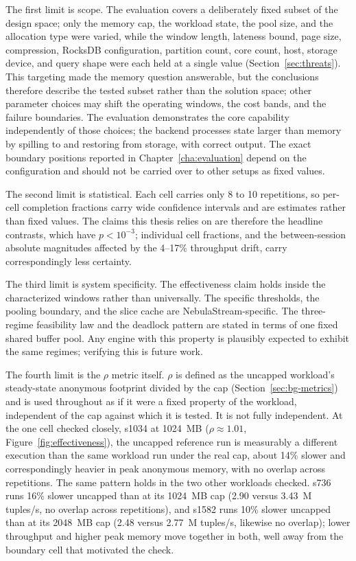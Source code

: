 The first limit is scope.
The evaluation covers a deliberately fixed subset of the design space; only the memory cap, the workload state, the pool size, and the allocation type were varied, while the window length, lateness bound, page size, compression, RocksDB configuration, partition count, core count, host, storage device, and query shape were each held at a single value (Section~\ref{sec:threats}).
This targeting made the memory question answerable, but the conclusions therefore describe the tested subset rather than the solution space; other parameter choices may shift the operating windows, the cost bands, and the failure boundaries.
The evaluation demonstrates the core capability independently of those choices; the backend processes state larger than memory by spilling to and restoring from storage, with correct output.
The exact boundary positions reported in Chapter~\ref{cha:evaluation} depend on the configuration and should not be carried over to other setups as fixed values.

The second limit is statistical.
Each cell carries only 8 to 10 repetitions, so per-cell completion fractions carry wide confidence intervals and are estimates rather than fixed values.
The claims this thesis relies on are therefore the headline contrasts, which have $p < 10^{-3}$; individual cell fractions, and the between-session absolute magnitudes affected by the 4--17\% throughput drift, carry correspondingly less certainty.

The third limit is system specificity.
The effectiveness claim holds inside the characterized windows rather than universally.
The specific thresholds, the pooling boundary, and the slice cache are NebulaStream-specific.
The three-regime feasibility law and the deadlock pattern are stated in terms of one fixed shared buffer pool.
Any engine with this property is plausibly expected to exhibit the same regimes; verifying this is future work.

The fourth limit is the $\rho$ metric itself.
$\rho$ is defined as the uncapped workload's steady-state anonymous footprint divided by the cap (Section~\ref{sec:bg-metrics}) and is used throughout as if it were a fixed property of the workload, independent of the cap against which it is tested.
It is not fully independent.
At the one cell checked closely, s1034 at 1024\, MB ($\rho \approx 1.01$, Figure~\ref{fig:effectiveness}), the uncapped reference run is measurably a different execution than the same workload run under the real cap, about 14\% slower and correspondingly heavier in peak anonymous memory, with no overlap across repetitions.
The same pattern holds in the two other workloads checked.
s736 runs 16\% slower uncapped than at its 1024\, MB cap (2.90 versus 3.43\, M tuples/s, no overlap across repetitions), and s1582 runs 10\% slower uncapped than at its 2048\, MB cap (2.48 versus 2.77\, M tuples/s, likewise no overlap); lower throughput and higher peak memory move together in both, well away from the boundary cell that motivated the check.

